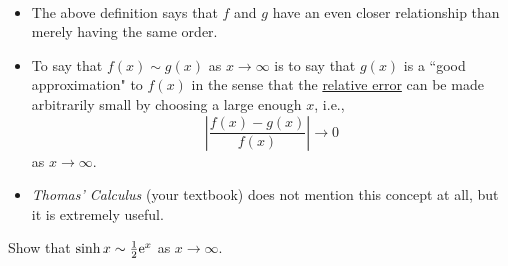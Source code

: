 \begin{remark}\,
\begin{itemize}
\item The above definition says that $f$ and $g$ have an even closer relationship than merely having the same order.
\item To say that $f(x)\sim g(x)$ as $x\to \infty$  is to say that $g(x)$ is a ``good approximation" to $f(x)$ in the sense that the \underline{relative error} can be made arbitrarily small by choosing a large enough $x$, i.e., 
\begin{equation*}
\left|\frac{f(x) - g(x)}{f(x)}\right|\to 0
\end{equation*}
as $x\to\infty$.
\item \textit{Thomas' Calculus} (your textbook) does not mention this concept at all, but it is extremely useful.
\end{itemize}
\end{remark}

\begin{example}
Show that $\sinh x\sim \frac{1}{2}\mathrm{e}^x$ as $x\to\infty$.
\end{example}
\ifdefined\SOLUTION
{}
\fi
